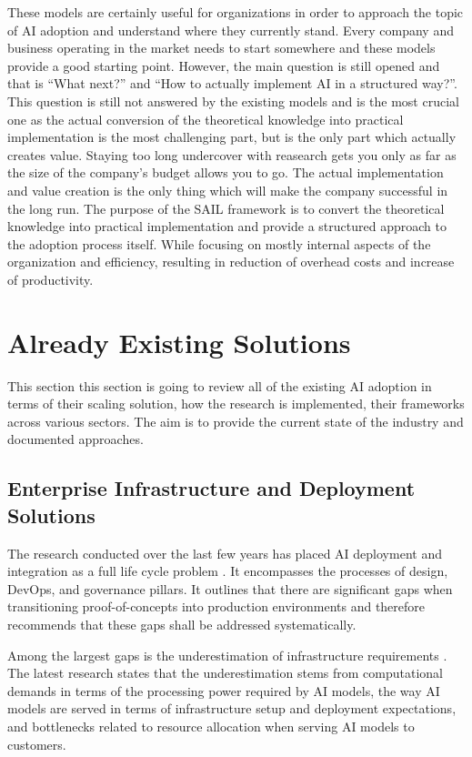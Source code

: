 \documentclass[]{imc-inf}
\begin{document}
These models are
certainly useful for organizations in order to approach the topic of AI
adoption and understand where they currently stand. Every company and
business operating in the market needs to start somewhere and these
models provide a good starting point. However, the main question is
still opened and that is ``What next?'' and ``How to actually implement
AI in a structured way?''. This question is still not answered by the
existing models and is the most crucial one as the actual conversion of
the theoretical knowledge into practical implementation is the most
challenging part, but is the only part which actually creates value.
Staying too long undercover with reasearch gets you only as far as the
size of the company's budget allows you to go. The actual implementation
and value creation is the only thing which will make the company
successful in the long run. The purpose of the SAIL framework is to
convert the theoretical knowledge into practical implementation and
provide a structured approach to the adoption process itself. While
focusing on mostly internal aspects of the organization and efficiency,
resulting in reduction of overhead costs and increase of productivity.

\section{Already Existing Solutions}\label{already-existing-solutions}

This section this section is going to review all of the existing AI adoption in terms of their scaling solution, how the research is implemented, their frameworks across various sectors. The aim is to provide the current state of the industry and documented approaches.


\subsection{Enterprise Infrastructure and Deployment Solutions}

The research conducted over the last few years has placed AI deployment and integration as a full life cycle problem \citep{Hechler2020, Sharma2024, Ali2018}. It encompasses the processes of design, DevOps, and governance pillars. It outlines that there are significant gaps when transitioning proof-of-concepts into production environments and therefore recommends that these gaps shall be addressed systematically. 

Among the largest gaps is the underestimation of infrastructure requirements \citep{Sharma2024, Hechler2020, Sundaramurthy2022}. The latest research states that the underestimation stems from computational demands in terms of the processing power required by AI models, the way AI models are served in terms of infrastructure setup and deployment expectations, and bottlenecks related to resource allocation when serving AI models to customers. 
\end{document}
